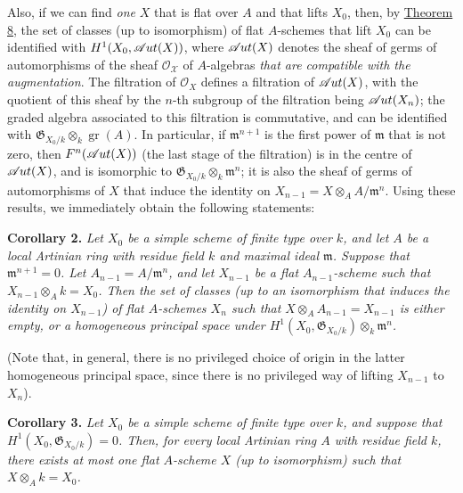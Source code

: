 \documentclass{article}
\newenvironment{itenv}[1]
  {\phantomsection\par\smallskip\noindent\textbf{#1.}\itshape}
  {\par\smallskip}
\theoremstyle{definition}
\theoremstyle{definition}
\theoremstyle{definition}
\theoremstyle{definition}
\theoremstyle{remark}
\begin{document}
Also, if we can find \emph{one} \(X\) that is flat over \(A\) and that lifts \(X_0\), then, by \protect\hyperlink{fga-2-theorem-8}{Theorem 8}, the set of classes (up to isomorphism) of flat \(A\)-schemes that lift \(X_0\) can be identified with \(H^1(X_0,\mathscr{A}\kern -.5pt ut(X))\), where \(\mathscr{A}\kern -.5pt ut(X)\) denotes the sheaf of germs of automorphisms of the sheaf \({\mathscr{O_X}}\) of \(A\)-algebras \emph{that are compatible with the augmentation}.
The filtration of \({\mathscr{O}}_X\) defines a filtration of \(\mathscr{A}\kern -.5pt ut(X)\), with the quotient of this sheaf by the \(n\)-th subgroup of the filtration being \(\mathscr{A}\kern -.5pt ut(X_n)\);
the graded algebra associated to this filtration is commutative, and can be identified with \({\mathfrak{G}}_{X_0/k}\otimes_k\operatorname{gr}(A)\).
In particular, if \({\mathfrak{m}}^{n+1}\) is the first power of \({\mathfrak{m}}\) that is not zero, then \(F^n(\mathscr{A}\kern -.5pt ut(X))\) (the last stage of the filtration) is in the centre of \(\mathscr{A}\kern -.5pt ut(X)\), and is isomorphic to \({\mathfrak{G}}_{X_0/k}\otimes_k{\mathfrak{m}}^n\);
it is also the sheaf of germs of automorphisms of \(X\) that induce the identity on \(X_{n-1}=X\otimes_A A/{\mathfrak{m}}^n\).
Using these results, we immediately obtain the following statements:

\leavevmode{}%
\begin{itenv}{Corollary 2}
Let \(X_0\) be a simple scheme of finite type over \(k\), and let \(A\) be a local Artinian ring with residue field \(k\) and maximal ideal \({\mathfrak{m}}\).
Suppose that \({\mathfrak{m}}^{n+1}=0\).
Let \(A_{n-1}=A/{\mathfrak{m}}^n\), and let \(X_{n-1}\) be a flat \(A_{n-1}\)-scheme such that \(X_{n-1}\otimes_Ak=X_0\).
Then the set of classes (up to an isomorphism that induces the identity on \(X_{n-1}\)) of flat \(A\)-schemes \(X_n\) such that \(X\otimes_AA_{n-1}=X_{n-1}\) is either empty, or a homogeneous principal space under \(H^1(X_0,{\mathfrak{G}}_{X_0/k})\otimes_k{\mathfrak{m}}^n\).

\end{itenv}

(Note that, in general, there is no privileged choice of origin in the latter homogeneous principal space, since there is no privileged way of lifting \(X_{n-1}\) to \(X_n\)).

\leavevmode{}%
\begin{itenv}{Corollary 3}
Let \(X_0\) be a simple scheme of finite type over \(k\), and suppose that \(H^1(X_0,{\mathfrak{G}}_{X_0/k})=0\).
Then, for every local Artinian ring \(A\) with residue field \(k\), \emph{there exists at most one flat \(A\)-scheme \(X\)} (up to isomorphism) such that \(X\otimes_Ak=X_0\).

\end{itenv}
\end{document}
